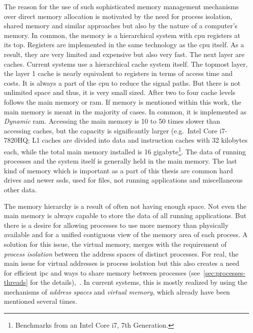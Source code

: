 The reason for the use of such sophisticated memory management mechanisms over direct memory allocation is motivated by the need for process isolation, shared memory and similar approaches but also by the nature of a computer's memory.
In common, the memory is a hierarchical system with \ac{cpu} registers at its top.
Registers are implemented in the same technology as the \ac{cpu} itself. 
As a result, they are very limited and expensive but also very fast.
The next layer are caches.
Current systems use a hierarchical cache system itself.
The topmost layer, the layer 1 cache is nearly equivalent to registers in terms of access time and costs\cite{tanenbaum-modern-operating-systems}.
It is always a part of the \ac{cpu} to reduce the signal paths.
But there is not unlimited space and thus, it is very small sized\cite{tanenbaum-modern-operating-systems}.
After two to four cache levels follows the main memory or \ac{ram}.
If memory is mentioned within this work, the main memory is meant in the majority of cases.
In common, it is implemented as \textit{Dynamic} \ac{ram}.
Accessing the main memory is 10 to 50 times slower than accessing caches, but the capacity is significantly larger (e.g.\ Intel Core i7-7820HQ; L1 caches are divided into data and instruction caches with 32 kilobytes each, while the total main memory installed is 16 gigabyte\footnote{Benchmarks from an Intel Core i7, 7th Generation.}\cite{mandl2014Grundkurs}.
The data of running processes and the system itself is generally held in the main memory.
The last kind of memory which is important as a part of this thesis are common hard drives and newer \acp{ssd}, used for files, not running applications and miscellaneous other data.

The memory hierarchy is a result of often not having enough space.
Not even the main memory is always capable to store the data of all running applications. 
But there is a desire for allowing processes to use more memory than physically available and for a unified contiguous view of the memory area of each process.
A solution for this issue, the virtual memory, merges with the requirement of \textit{process isolation} between the address spaces of distinct processes.
For real, the main issue for virtual addresses is process isolation but this also creates a need for efficient \acf{ipc} and ways to share memory between processes (see~\ref{sec:processes-threads} for the details)\cite{mandl2014Grundkurs},~\cite{brause2017betriebssysteme}.
In current systems, this is mostly realized by using the mechanisms of \textit{address spaces} and \textit{virtual memory}, which already have been mentioned several times.


